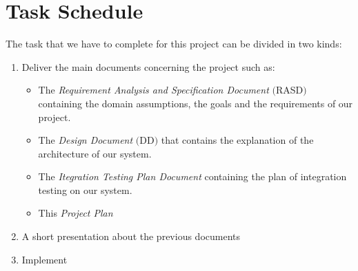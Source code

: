 \section{Task Schedule}
The task that we have to complete for this project can be divided in two kinds:
\begin{enumerate}
\item Deliver the main documents concerning the project such as:
	\begin{itemize}
		\item The \textit{Requirement Analysis and Specification Document} $($RASD$)$ containing the domain assumptions, the goals and the requirements of our project.
		\item The \textit{Design Document} $($DD$)$ that contains the explanation of the architecture of our system.
		\item The \textit{Itegration Testing Plan Document} containing the plan of integration testing on our system.
		\item This \textit{Project Plan}
	\end{itemize}
\item A short presentation about the previous documents
\item Implement
\end{enumerate}